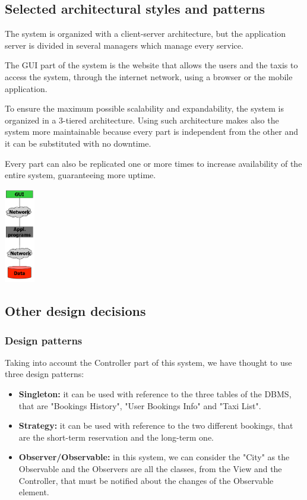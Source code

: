 \subsection{Selected architectural styles and patterns}
	The system is organized with a client-server architecture, but the application server is divided in several managers which manage every service. 
	
	The GUI part of the system is the website that allows the users and the taxis to access the system, through the internet network, using a browser or the mobile application.
	
	To ensure the maximum possible scalability and expandability, the system is organized in a 3-tiered architecture. Using such architecture makes also the system more maintainable because every part is independent from the other and it can be substituted with no downtime.
	
	Every part can also be replicated one or more times to increase availability of the entire system, guaranteeing more uptime.
	\begin{center}	
	    	\includegraphics[width=0.10\textwidth]{./images/architecture.png}
	\end{center}	  	
\subsection{Other design decisions}
	\subsubsection{Design patterns}
	Taking into account the Controller part of this system, we have thought to use three design patterns:
		\begin{itemize}
			\item \textbf{Singleton:} it can be used with reference to the three tables of the DBMS, that are "Bookings History", "User Bookings Info" and "Taxi List".
			\item \textbf{Strategy:} it can be used with reference to the two different bookings, that are the short-term reservation and the long-term one.
			\item \textbf{Observer/Observable:} in this system, we can consider the "City" as the Observable and the Observers are all the classes, from the View and the Controller, that must be notified about the changes of the Observable element.
		\end{itemize}
		
		
		
		
		
		
		
		
		
		
		
		
		
		
		
		
		
		
		
		
		
		
		
		
		
		
		
	
	
	
	
	
	